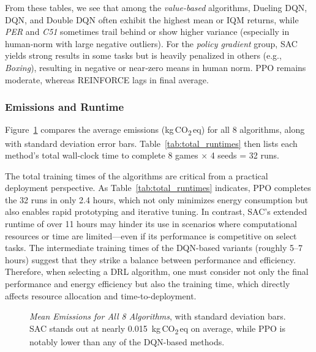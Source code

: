 From these tables, we see that among the \emph{value-based} algorithms, 
Dueling DQN, DQN, and Double DQN often exhibit the highest mean or IQM returns, while 
\emph{PER} and \emph{C51} sometimes trail behind or show higher variance (especially in 
human‐norm with large negative outliers). For the \emph{policy gradient} group, SAC yields strong 
results in some tasks but is heavily penalized in others (e.g., \emph{Boxing}), resulting 
in negative or near‐zero means in human norm. PPO remains moderate, whereas REINFORCE 
lags in final average.

\subsubsection{Emissions and Runtime}

Figure~\ref{fig:barplot_emissions_total} compares the average emissions (kg\,CO\textsubscript{2}\,eq) for 
all 8 algorithms, along with standard deviation error bars. Table~\ref{tab:total_runtimes} 
then lists each method's total wall‐clock time to complete 8 games × 4 seeds = 32 runs.

The total training times of the algorithms are critical from a practical deployment perspective. As Table~\ref{tab:total_runtimes} indicates, PPO completes the 32 runs in only 2.4 hours, which not only minimizes energy consumption but also enables rapid prototyping and iterative tuning. In contrast, SAC's extended runtime of over 11 hours may hinder its use in scenarios where computational resources or time are limited—even if its performance is competitive on select tasks. The intermediate training times of the DQN-based variants (roughly 5–7 hours) suggest that they strike a balance between performance and efficiency. Therefore, when selecting a DRL algorithm, one must consider not only the final performance and energy efficiency but also the training time, which directly affects resource allocation and time-to-deployment.

\begin{figure} 
	\centering
	
	\caption{\emph{Mean Emissions for All 8 Algorithms}, with standard deviation bars.
		SAC stands out at nearly 0.015~kg\,CO\textsubscript{2}\,eq on average, while PPO is notably lower than
		any of the DQN-based methods.}
	\label{fig:barplot_emissions_total}
\end{figure}

